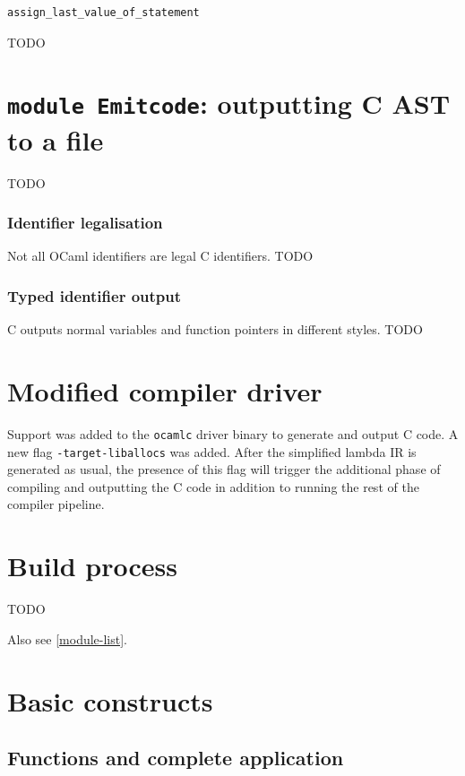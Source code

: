 \documentclass[12pt,a4paper,twoside,openright]{report}
\begin{document}
\begin{lstlisting}
assign_last_value_of_statement
\end{lstlisting}

TODO

\section{\texttt{module Emitcode}: outputting C AST to a file}\label{emitcode}

TODO

\subsubsection{Identifier legalisation}

Not all OCaml identifiers are legal C identifiers. TODO

\subsubsection{Typed identifier output}

C outputs normal variables and function pointers in different styles. TODO

\section{Modified compiler driver}\label{modified-compiler-driver}

Support was added to the \lstinline!ocamlc! driver binary to generate and
output C code. A new flag \lstinline!-target-liballocs! was added. After the
simplified lambda IR is generated as usual, the presence of this flag will
trigger the additional phase of compiling and outputting the C code in addition
to running the rest of the compiler pipeline.

\section{Build process}\label{build-process}

TODO

Also see \ref{module-list}.


\section{Basic constructs}

\subsection{Functions and complete application}\label{functions}
\end{document}
